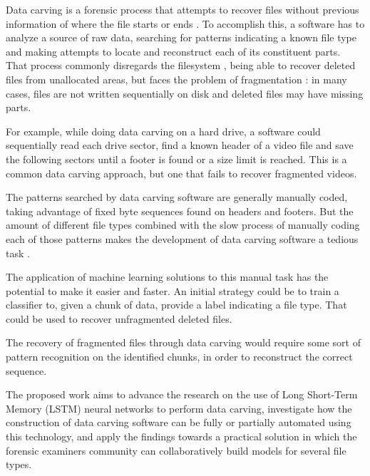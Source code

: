 
Data carving is a forensic process that attempts to recover files without previous information of where the file starts or ends \cite{garfinkel_carving_2007}.
To accomplish this, a software has to analyze a source of raw data, searching for patterns indicating a known file type and making attempts to locate and reconstruct each of its constituent parts.
That process commonly disregards the filesystem \cite{veenman_statistical_2007}, being able to recover deleted files from unallocated areas, but faces the problem of fragmentation \cite{veenman_statistical_2007}  \cite{pal_evolution_2009}: in many cases, files are not written sequentially on disk and deleted files may have missing parts.

For example, while doing data carving on a hard drive, a software could sequentially read each drive sector, find a known header of a video file and save the following sectors until a footer is found or a size limit is reached. This is a common data carving approach, but one that fails to recover fragmented videos.

The patterns searched by data carving software are generally manually coded, taking advantage of fixed byte sequences found on headers and footers. But the amount of different file types combined with the slow process of manually coding each of those patterns makes the development of data carving software a tedious task \cite{mcdaniel_content_2003}.

The application of machine learning solutions to this manual task has the potential to make it easier and faster. An initial strategy could be to train a classifier to, given a chunk of data, provide a label indicating a file type. That could be used to recover unfragmented deleted files.

The recovery of fragmented files through data carving would require some sort of pattern recognition on the identified chunks, in order to reconstruct the correct sequence.

The proposed work aims to advance the research on the use of Long Short-Term Memory (LSTM) neural networks to perform data carving, investigate how the construction of data carving software can be fully or partially automated using this technology, and apply the findings towards a practical solution in which the forensic examiners community     can collaboratively build models for several file types.

